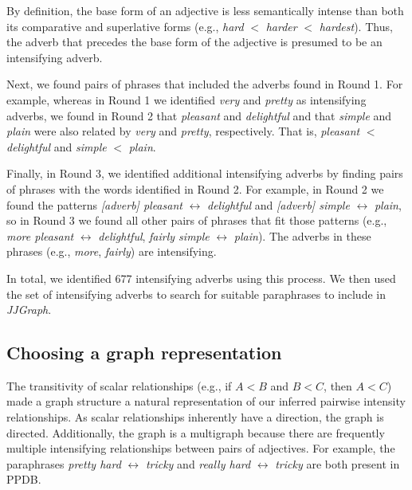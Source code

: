 \documentclass[11pt,a4paper]{article}
\begin{document}
By definition, the base form of an adjective is less semantically intense than both its comparative and superlative forms (e.g., \textit{hard} $<$ \textit{harder} $<$ \textit{hardest}). Thus, the adverb that precedes the base form of the adjective is presumed to be an intensifying adverb. 

Next, we found pairs of phrases that included the adverbs found in Round 1. For example, whereas in Round 1 we identified \textit{very} and \textit{pretty} as intensifying adverbs, we found in Round 2 that \textit{pleasant} and \textit{delightful} and that \textit{simple} and \textit{plain} were also related by \textit{very} and \textit{pretty}, respectively. That is, \textit{pleasant} $<$ \textit{delightful} and \textit{simple} $<$ \textit{plain}. 

Finally, in Round 3, we identified additional intensifying adverbs by finding pairs of phrases with the words identified in Round 2. For example, in Round 2 we found the patterns \textit{[adverb] pleasant} $\leftrightarrow$ \textit{delightful} and \textit{[adverb] simple} $\leftrightarrow$ \textit{plain}, so in Round 3 we found all other pairs of phrases that fit those patterns (e.g., \textit{more pleasant} $\leftrightarrow$ \textit{delightful}, \textit{fairly simple} $\leftrightarrow$ \textit{plain}). The adverbs in these phrases (e.g., \textit{more}, \textit{fairly}) are intensifying.

In total, we identified 677 intensifying adverbs using this process. We then used the set of intensifying adverbs to search for suitable paraphrases to include in \textit{JJGraph}.

\subsection{Choosing a graph representation}

The transitivity of scalar relationships (e.g., if $A < B$ and $B < C$, then $A < C$) made a graph structure a natural representation of our inferred pairwise intensity relationships. As scalar relationships inherently have a direction, the graph is directed. Additionally, the graph is a multigraph because there are frequently multiple intensifying relationships between pairs of adjectives. For example, the paraphrases \textit{pretty hard} $\leftrightarrow$ \textit{tricky} and \textit{really hard} $\leftrightarrow$ \textit{tricky} are both present in PPDB.

\end{document}
